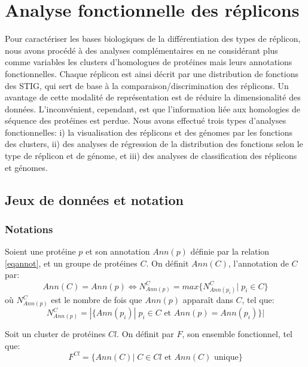 \newpage
\chapter{Analyse fonctionnelle des réplicons}\label{chap6true}
\label{paranalysefunc}
	
	Pour caractériser les bases biologiques de la différentiation des types de réplicon, nous avons procédé à des analyses complémentaires en ne considérant plus comme variables les clusters d'homologues de protéines mais leurs annotations fonctionnelles. Chaque réplicon est ainsi décrit par une distribution de fonctions des STIG, qui sert de base à la comparaison/discrimination des réplicons. Un avantage de cette modalité de représentation est de réduire la dimensionalité des données. L'inconvénient, cependant, est que l'information liée aux homologies de séquence des protéines est perdue. Nous avons effectué trois types d'analyses fonctionnelles: i) la visualisation des réplicons et des génomes par les fonctions des clusters, ii) des analyses de régression de la distribution des fonctions selon le type de réplicon et de génome, et iii) des analyses de classification des réplicons et génomes.
	
\section{Jeux de données et notation}\label{pardonnee2}

\subsection{Notations}
Soient une protéine $p$ et son annotation $Ann(p)$ définie par la relation \ref{eqannot}, et un groupe de protéines $C$. On définit $Ann(C)$, l'annotation de $C$ par:
	 \begin{equation}
		Ann(C)=Ann(p) \iff N^{C}_{Ann(p)}=max\{N^{C}_{Ann(p_{i})}|\; p_{i} \in C\}
	\end{equation}
	où $N^{C}_{Ann(p)}$ est le nombre de fois que $Ann(p)$ apparaît dans $C$, tel que:
		 \begin{equation}
			N^{C}_{Ann(p)}=|\{Ann(p_{i})|\; p_{i} \in C \textrm{ et } Ann(p)=Ann(p_{i}) \}|
		\end{equation}

Soit un cluster de protéines $Cl$. On définit par $F$, son ensemble fonctionnel, tel que:
	\begin{equation}
		F^{Cl} = \{Ann(C)|\; C \in Cl \textrm{ et } Ann(C) \textrm{ unique} \}
	\end{equation}   

